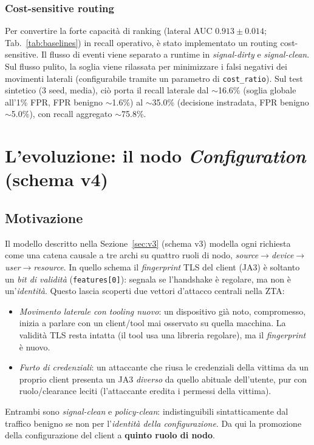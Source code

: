 \documentclass[11pt,a4paper]{report}
\begin{document}
\subsubsection{Cost-sensitive routing}

Per convertire la forte capacità di ranking (lateral AUC $0.913\pm0.014$; Tab.~\ref{tab:baselines}) in recall operativo, è stato implementato un routing cost-sensitive. Il flusso di eventi viene separato a runtime in \textit{signal-dirty} e \textit{signal-clean}. Sul flusso pulito, la soglia viene rilassata per minimizzare i falsi negativi dei movimenti laterali (configurabile tramite un parametro di \texttt{cost\_ratio}). Sul test sintetico (3 seed, media), ciò porta il recall laterale dal $\sim$16.6\% (soglia globale all'1\% FPR, FPR benigno $\sim$1.6\%) al $\sim$35.0\% (decisione instradata, FPR benigno $\sim$5.0\%), con recall aggregato $\sim$75.8\%.

\section{L'evoluzione: il nodo \textit{Configuration} (schema v4)}
\label{sec:v4}

\subsection{Motivazione}

Il modello descritto nella Sezione~\ref{sec:v3} (schema v3) modella ogni richiesta come una catena causale a tre archi su quattro ruoli di nodo, \textit{source}$\rightarrow$\textit{device}$\rightarrow$\textit{user}$\rightarrow$\textit{resource}. In quello schema il \textit{fingerprint} TLS del client (JA3) è soltanto un \emph{bit di validità} (\texttt{features[0]}): segnala se l'handshake è regolare, ma non è un'\emph{identità}. Questo lascia scoperti due vettori d'attacco centrali nella ZTA:
\begin{itemize}
    \item \textit{Movimento laterale con tooling nuovo}: un dispositivo già noto, compromesso, inizia a parlare con un client/tool mai osservato su quella macchina. La validità TLS resta intatta (il tool usa una libreria regolare), ma il \emph{fingerprint} è nuovo.
    \item \textit{Furto di credenziali}: un attaccante che riusa le credenziali della vittima da un proprio client presenta un JA3 \emph{diverso} da quello abituale dell'utente, pur con ruolo/clearance leciti (l'attaccante eredita i permessi della vittima).
\end{itemize}
Entrambi sono \emph{signal-clean} e \emph{policy-clean}: indistinguibili sintatticamente dal traffico benigno se non per l'\emph{identità della configurazione}. Da qui la promozione della configurazione del client a \textbf{quinto ruolo di nodo}.
\end{document}
